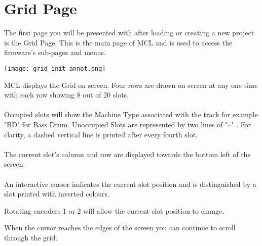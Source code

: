 
\chapter{Grid Page}
The first page you will be presented with after loading or creating a new project is the Grid Page. This is the main page of MCL and is used to access the firmware's sub-pages and menus.

\begin{center}
	\texttt{[image: grid\_init\_annot.png]}
\end{center}
MCL displays the Grid on screen. Four rows are drawn on screen at any one time with each row showing 8 out of 20 slots.\\
\\
Occupied slots will show the Machine Type associated with the track for example "BD" for Bass Drum. Unoccupied Slots are represented by two lines of "--" . For clarity, a dashed vertical line is printed after every fourth slot.\\
\\
The current slot's column and row are displayed towards the bottom left of the screen.\\
\\
An interactive cursor indicates the current slot position and is distinguished by a slot printed with inverted colours.


Rotating encoders 1 or 2 will allow the current slot position to change.

When the cursor reaches the edges of the screen you can continue to scroll through the grid.